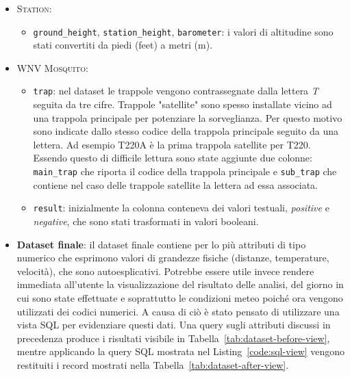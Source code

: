 \begin{itemize}
	\item \textsc{Station}:
	\begin{itemize}
    	\item \texttt{ground\_height}, \texttt{station\_height}, 
    	\texttt{barometer}: i valori di altitudine sono stati convertiti da
    	piedi (feet) a metri (m).
	\end{itemize}
		
	\item \textsc{WNV Mosquito}:
	
	\begin{itemize}
		
		\item \texttt{trap}: nel dataset le trappole vengono contrassegnate 
		dalla lettera \textit{T} seguita da tre cifre. Trappole "satellite" 
		sono spesso installate vicino ad una trappola principale per potenziare 
		la sorveglianza. Per questo motivo sono indicate dallo stesso codice 
		della trappola principale seguito da una lettera. Ad esempio T220A è la 
		prima trappola satellite per T220. Essendo questo di difficile lettura 
		sono state aggiunte due colonne: \texttt{main\_trap} che riporta il 
		codice della trappola principale e \texttt{sub\_trap} che contiene nel 
		caso delle trappole satellite la lettera ad essa associata.
		
		\item \texttt{result}: inizialmente la colonna conteneva dei valori  
		testuali, \textit{positive} e \textit{negative}, che sono stati 
		trasformati in valori booleani.			
	\end{itemize}
	
	\item \textbf{Dataset finale}: il dataset finale contiene per lo più 
	attributi di tipo numerico che esprimono valori di grandezze fisiche 
	(distanze, temperature, velocità), che sono autoesplicativi. Potrebbe 
	essere utile invece rendere immediata all'utente la visualizzazione del 
	risultato delle analisi, del giorno in cui sono state effettuate e 
	soprattutto le condizioni meteo poiché ora vengono utilizzati dei codici 
	numerici. A causa di ciò è stato pensato di utilizzare una vista SQL per 
	evidenziare questi dati. Una query sugli attributi discussi in precedenza 
	produce i risultati visibile in Tabella~\ref{tab:dataset-before-view}, 
	mentre applicando la query SQL mostrata nel Listing~\ref{code:sql-view} 
	vengono restituiti i record mostrati nella 
	Tabella~\ref{tab:dataset-after-view}.


\end{itemize}
